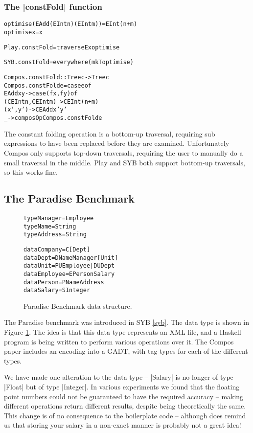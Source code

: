 \documentclass[preprint]{sigplanconf}
\newenvironment{code}{\begin{alltt}\small}{\end{alltt}}
\begin{document}
\subsubsection{The |constFold| function}

\begin{code}
optimise (EAdd (EInt n) (EInt m)) = EInt (n+m)
optimise x = x

Play.constFold = traverseEx optimise

SYB.constFold = everywhere (mkT optimise)

Compos.constFold :: Tree c -> Tree c
Compos.constFold e = case e of
    EAdd x y -> case  (f x, f y) of
                      (CEInt n, CEInt m) -> CEInt (n+m)
                      (x',y') -> CEAdd x' y'
    _ -> composOp Compos.constFold e
\end{code}

The constant folding operation is a bottom-up traversal, requiring sub expressions to have been replaced before they are examined. Unfortunately Compos only supports top-down traversals, requiring the user to manually do a small traversal in the middle. Play and SYB both support bottom-up traversals, so this works fine.


\subsection{The Paradise Benchmark}

\begin{figure}
\begin{code}
type Manager  = Employee
type Name     = String
type Address  = String

data Company   = C [Dept]
data Dept      = D Name Manager [Unit]
data Unit      = PU Employee | DU Dept
data Employee  = E Person Salary
data Person    = P Name Address
data Salary    = S Integer
\end{code}
\caption{Paradise Benchmark data structure.}
\label{fig:paradise}
\end{figure}

The Paradise benchmark was introduced in SYB \ref{syb}. The data type is shown in Figure \ref{fig:paradise}. The idea is that this data type represents an XML file, and a Haskell program is being written to perform various operations over it. The Compos paper includes an encoding into a GADT, with tag types for each of the different types.

We have made one alteration to the data type -- |Salary| is no longer of type |Float| but of type |Integer|. In various experiments we found that the floating point numbers could not be guaranteed to have the required accuracy -- making different operations return different results, despite being theoretically the same. This change is of no consequence to the boilerplate code -- although does remind us that storing your salary in a non-exact manner is probably not a great idea!
\end{document}
